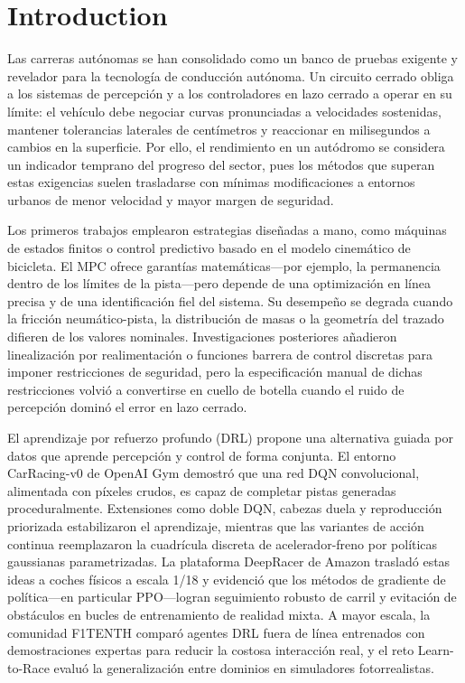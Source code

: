 \section{Introduction}
Las carreras autónomas se han consolidado como un banco de pruebas exigente y revelador para la tecnología de conducción autónoma. Un circuito cerrado obliga a los sistemas de percepción y a los controladores en lazo cerrado a operar en su límite: el vehículo debe negociar curvas pronunciadas a velocidades sostenidas, mantener tolerancias laterales de centímetros y reaccionar en milisegundos a cambios en la superficie. Por ello, el rendimiento en un autódromo se considera un indicador temprano del progreso del sector, pues los métodos que superan estas exigencias suelen trasladarse con mínimas modificaciones a entornos urbanos de menor velocidad y mayor margen de seguridad.

Los primeros trabajos emplearon estrategias diseñadas a mano, como máquinas de estados finitos o control predictivo basado en el modelo cinemático de bicicleta. El MPC ofrece garantías matemáticas—por ejemplo, la permanencia dentro de los límites de la pista—pero depende de una optimización en línea precisa y de una identificación fiel del sistema. Su desempeño se degrada cuando la fricción neumático-pista, la distribución de masas o la geometría del trazado difieren de los valores nominales. Investigaciones posteriores añadieron linealización por realimentación o funciones barrera de control discretas para imponer restricciones de seguridad, pero la especificación manual de dichas restricciones volvió a convertirse en cuello de botella cuando el ruido de percepción dominó el error en lazo cerrado.

El aprendizaje por refuerzo profundo (DRL) propone una alternativa guiada por datos que aprende percepción y control de forma conjunta. El entorno CarRacing-v0 de OpenAI Gym demostró que una red DQN convolucional, alimentada con píxeles crudos, es capaz de completar pistas generadas proceduralmente. Extensiones como doble DQN, cabezas duela y reproducción priorizada estabilizaron el aprendizaje, mientras que las variantes de acción continua reemplazaron la cuadrícula discreta de acelerador-freno por políticas gaussianas parametrizadas. La plataforma DeepRacer de Amazon trasladó estas ideas a coches físicos a escala 1/18 y evidenció que los métodos de gradiente de política—en particular PPO—logran seguimiento robusto de carril y evitación de obstáculos en bucles de entrenamiento de realidad mixta. A mayor escala, la comunidad F1TENTH comparó agentes DRL fuera de línea entrenados con demostraciones expertas para reducir la costosa interacción real, y el reto Learn-to-Race evaluó la generalización entre dominios en simuladores fotorrealistas.

